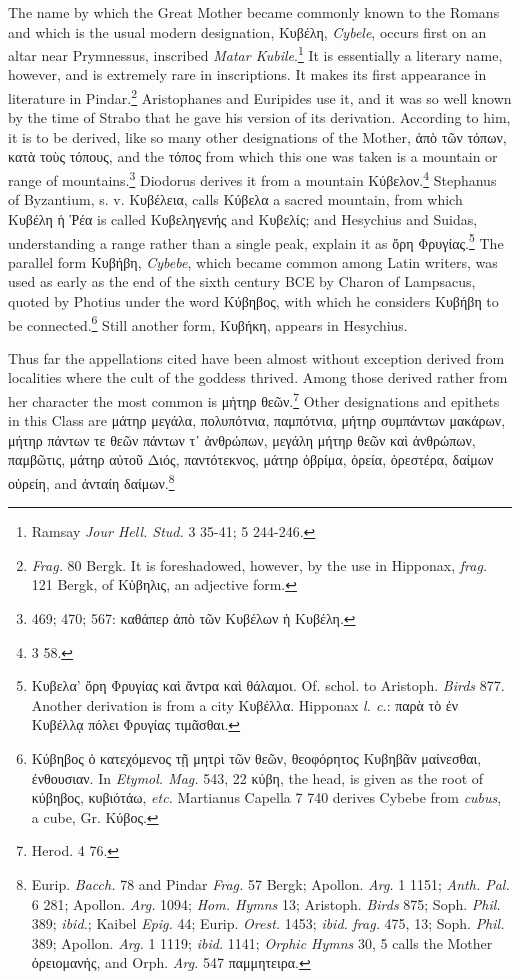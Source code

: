 \documentclass[a4paper, 11pt, oneside, polutonikogreek, english]{article}
\begin{document}
The name by which the Great Mother became commonly known to the Romans and which is the usual modern designation, Κυβέλη, \emph{Cybele}, occurs first on an altar near Prymnessus, inscribed \emph{Matar Kubile}.\footnote{Ramsay \emph{Jour Hell. Stud.} 3 35-41; 5 244-246.} It is essentially a literary name, however, and is extremely rare in inscriptions. It makes its first appearance in literature in Pindar.\footnote{\emph{Frag.} 80 Bergk. It is foreshadowed, however, by the use in Hipponax, \emph{frag.} 121 Bergk, of Κὑβηλις, an adjective form.} Aristophanes and Euripides use it, and it was so well known by the time of Strabo that he gave his version of its derivation. According to him, it is to be derived, like so many other designations of the Mother, ἀπὸ τῶν τόπων, κατὰ τοὺς τόπους, and the τόπος from which this one was taken is a mountain or range of mountains.\footnote{469; 470; 567: καθάπερ ἀπὸ τῶν Κυβέλων ἡ Κυβέλη.} Diodorus derives it from a mountain Κύβελον.\footnote{3 58.} Stephanus of Byzantium, s. v. Κυβέλεια, calls Κύβελα a sacred mountain, from which Κυβέλη ἡ Ῥέα is called Κυβεληγενής and Κυβελίς; and Hesychius and Suidas, understanding a range rather than a single peak, explain it as ὄρη Φρυγίας.\footnote{Κυβελα' ὄρη Φρυγίας καὶ ἄντρα καὶ θάλαμοι. Of. schol. to Aristoph. \emph{Birds} 877. Another derivation is from a city Κυβέλλα. Hipponax \emph{l. c.}: παρὰ τὸ ἐν Κυβέλλᾳ πόλει Φρυγίας τιμᾶσθαι.} The parallel form Κυβήβη, \emph{Cybebe}, which became common among Latin writers, was used as early as the end of the sixth century \textsc{BCE} by Charon of Lampsacus, quoted by Photius under the word Κύβηβος, with which he considers Κυβήβη to be connected.\footnote{Κύβηβος ὁ κατεχόμενος τῇ μητρὶ τῶν θεῶν, θεοφόρητος Κυβηβᾶν μαίνεσθαι, ἐνθουσιαν. In \emph{Etymol. Mag.} 543, 22 κύβη, the head, is given as the root of κύβηβος, κυβιότάω, \emph{etc.} Martianus Capella 7 740 derives Cybebe from \emph{cubus}, a cube, Gr. Κύβος.} Still another form, Κυβήκη, appears in Hesychius.

Thus far the appellations cited have been almost without exception derived from localities where the cult of the goddess thrived. Among those derived rather from her character the most common is μήτηρ θεῶν.\footnote{Herod. 4 76.} Other designations and epithets in this Class are μάτηρ μεγάλα, πολυπότνια, παμπότνια, μήτηρ συμπάντων μακάρων, μήτηρ πάντων τε θεῶν πάντων τ᾽ ἀνθρώπων, μεγάλη μήτηρ θεῶν καὶ ἀνθρώπων, παμβῶτις, μάτηρ αὐτοῦ Διός, παντότεκνος, μάτηρ ὀβρίμα, ὀρεία, ὀρεστέρα, δαίμων οὐρείη, and ἀνταίη δαίμων.\footnote{Eurip. \emph{Bacch.} 78 and Pindar \emph{Frag.} 57 Bergk; Apollon. \emph{Arg.} 1 1151; \emph{Anth. Pal.} 6 281; Apollon. \emph{Arg.} 1094; \emph{Hom. Hymns} 13; Aristoph. \emph{Birds} 875; Soph. \emph{Phil.} 389; \emph{ibid.}; Kaibel \emph{Epig.} 44; Eurip. \emph{Orest.} 1453; \emph{ibid.} \emph{frag.} 475, 13; Soph. \emph{Phil.} 389; Apollon. \emph{Arg.} 1 1119; \emph{ibid.} 1141; \emph{Orphic Hymns} 30, 5 calls the Mother ὀρειομανής, and Orph. \emph{Arg.} 547 παμμητειρα.}
\end{document}
